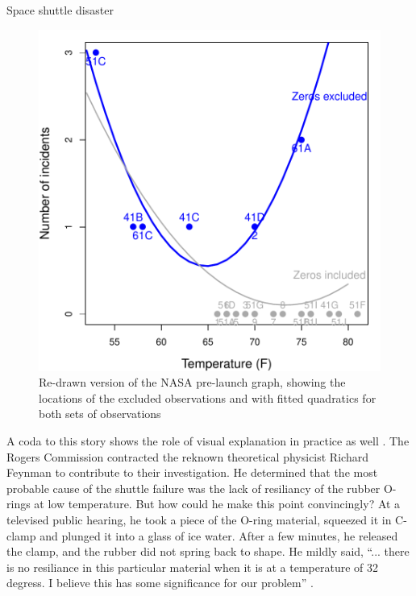 \documentclass[11pt]{book}
\begin{document}
\begin{Example}[nasa]{Space shuttle disaster}
\begin{figure}[htb]
  \centering
  \includegraphics[width=.7\textwidth,clip]{ch01/fig/nasa}
  \caption{Re-drawn version of the NASA pre-launch graph, showing the locations of the excluded observations and with fitted quadratics for both sets of observations}\label{fig:nasa}
\end{figure}

A coda to this story shows the role of visual explanation in practice as well
\citep[p. 50--53]{Tufte:97}.
The Rogers Commission contracted the reknown theoretical physicist Richard Feynman
to contribute to their investigation.  He determined that the most probable
cause of the shuttle failure was the lack of resiliancy of the rubber O-rings
at low temperature. But how could he make this point convincingly?
At a televised public hearing, he took a piece of the O-ring material,
squeezed it in C-clamp and plunged it into a glass of ice water.
After a few minutes, he released the clamp, and the rubber did not spring
back to shape.  He mildly said,
``... there is no resiliance in this particular material when it is at a
temperature of 32 degress. I believe this has some significance for our
problem'' \citep{Feynman:1988}.

\end{Example}
\end{document}
